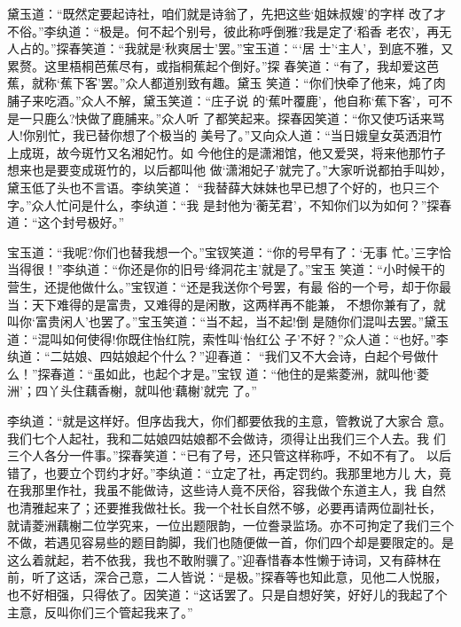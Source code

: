 黛玉道：“既然定要起诗社，咱们就是诗翁了，先把这些‘姐妹叔嫂’的字样
改了才不俗。”李纨道：“极是。何不起个别号，彼此称呼倒雅?我是定了‘稻香
老农’，再无人占的。”探春笑道：“我就是‘秋爽居士’罢。”宝玉道：“‘居
士’‘主人’，到底不雅，又累赘。这里梧桐芭蕉尽有，或指桐蕉起个倒好。”探
春笑道：“有了，我却爱这芭蕉，就称‘蕉下客’罢。”众人都道别致有趣。黛玉
笑道：“你们快牵了他来，炖了肉脯子来吃酒。”众人不解，黛玉笑道：“庄子说
的‘蕉叶覆鹿’，他自称‘蕉下客’，可不是一只鹿么?快做了鹿脯来。”众人听
了都笑起来。探春因笑道：“你又使巧话来骂人!你别忙，我已替你想了个极当的
美号了。”又向众人道：“当日娥皇女英洒泪竹上成斑，故今斑竹又名湘妃竹。如
今他住的是潇湘馆，他又爱哭，将来他那竹子想来也是要变成斑竹的，以后都叫他
做‘潇湘妃子’就完了。”大家听说都拍手叫妙，黛玉低了头也不言语。李纨笑道：
“我替薛大妹妹也早已想了个好的，也只三个字。”众人忙问是什么，李纨道：“我
是封他为‘蘅芜君’，不知你们以为如何？”探春道：“这个封号极好。”

宝玉道：“我呢?你们也替我想一个。”宝钗笑道：“你的号早有了：‘无事
忙。’三字恰当得很！”李纨道：“你还是你的旧号‘绛洞花主’就是了。”宝玉
笑道：“小时候干的营生，还提他做什么。”宝钗道：“还是我送你个号罢，有最
俗的一个号，却于你最当：天下难得的是富贵，又难得的是闲散，这两样再不能兼，
不想你兼有了，就叫你‘富贵闲人’也罢了。”宝玉笑道：“当不起，当不起!倒
是随你们混叫去罢。”黛玉道：“混叫如何使得!你既住怡红院，索性叫‘怡红公
子’不好？”众人道：“也好。”李纨道：“二姑娘、四姑娘起个什么？”迎春道：
“我们又不大会诗，白起个号做什么！”探春道：“虽如此，也起个才是。”宝钗
道：“他住的是紫菱洲，就叫他‘菱洲’；四丫头住藕香榭，就叫他‘藕榭’就完
了。”

李纨道：“就是这样好。但序齿我大，你们都要依我的主意，管教说了大家合
意。我们七个人起社，我和二姑娘四姑娘都不会做诗，须得让出我们三个人去。我
们三个人各分一件事。”探春笑道：“已有了号，还只管这样称呼，不如不有了。
以后错了，也要立个罚约才好。”李纨道：“立定了社，再定罚约。我那里地方儿
大，竟在我那里作社，我虽不能做诗，这些诗人竟不厌俗，容我做个东道主人，我
自然也清雅起来了；还要推我做社长。我一个社长自然不够，必要再请两位副社长，
就请菱洲藕榭二位学究来，一位出题限韵，一位誊录监场。亦不可拘定了我们三个
不做，若遇见容易些的题目韵脚，我们也随便做一首，你们四个却是要限定的。是
这么着就起，若不依我，我也不敢附骥了。”迎春惜春本性懒于诗词，又有薛林在
前，听了这话，深合己意，二人皆说：“是极。”探春等也知此意，见他二人悦服，
也不好相强，只得依了。因笑道：“这话罢了。只是自想好笑，好好儿的我起了个
主意，反叫你们三个管起我来了。”

